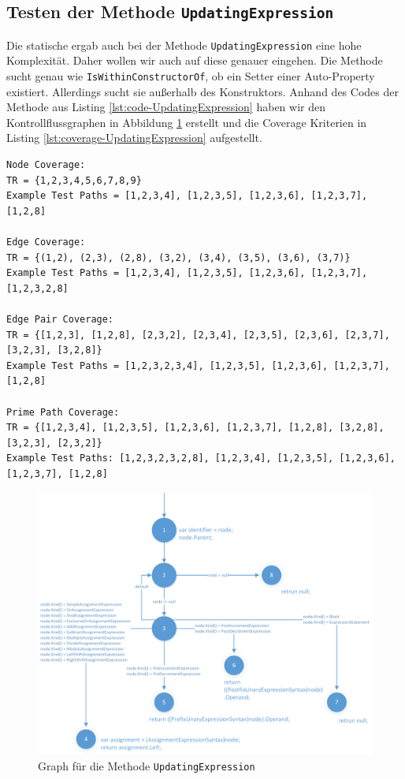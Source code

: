 \subsection{Testen der Methode \texttt{UpdatingExpression}}
Die statische ergab auch bei der Methode \texttt{UpdatingExpression} eine hohe Komplexität. Daher wollen wir auch auf diese genauer eingehen. Die Methode sucht genau wie \texttt{IsWithinConstructorOf}, ob ein Setter einer Auto-Property existiert. Allerdings sucht sie außerhalb des Konstruktors. Anhand des Codes der Methode aus Listing \ref{lst:code-UpdatingExpression} haben wir den Kontrollflussgraphen in Abbildung \ref{fig:graph-UpdatingExpression} erstellt und die Coverage Kriterien in Listing \ref{lst:coverage-UpdatingExpression} aufgestellt.
\begin{lstlisting}[caption={Coverage für die Mehtode \texttt{UpdatingExpression}},
label=lst:coverage-UpdatingExpression]
Node Coverage:
TR = {1,2,3,4,5,6,7,8,9}
Example Test Paths = [1,2,3,4], [1,2,3,5], [1,2,3,6], [1,2,3,7], [1,2,8]

Edge Coverage:
TR = {(1,2), (2,3), (2,8), (3,2), (3,4), (3,5), (3,6), (3,7)}
Example Test Paths = [1,2,3,4], [1,2,3,5], [1,2,3,6], [1,2,3,7], [1,2,3,2,8]

Edge Pair Coverage:
TR = {[1,2,3], [1,2,8], [2,3,2], [2,3,4], [2,3,5], [2,3,6], [2,3,7], [3,2,3], [3,2,8]}
Example Test Paths = [1,2,3,2,3,4], [1,2,3,5], [1,2,3,6], [1,2,3,7], [1,2,8]

Prime Path Coverage:
TR = {[1,2,3,4], [1,2,3,5], [1,2,3,6], [1,2,3,7], [1,2,8], [3,2,8], [3,2,3], [2,3,2]}
Example Test Paths: [1,2,3,2,3,2,8], [1,2,3,4], [1,2,3,5], [1,2,3,6], [1,2,3,7], [1,2,8]
\end{lstlisting}
\begin{figure}[h]
	\centering
	\includegraphics[width=\textwidth]{images/GraphUpdatingExpression.png}
	\caption{Graph für die Methode \texttt{UpdatingExpression}}
	\label{fig:graph-UpdatingExpression}
\end{figure}
